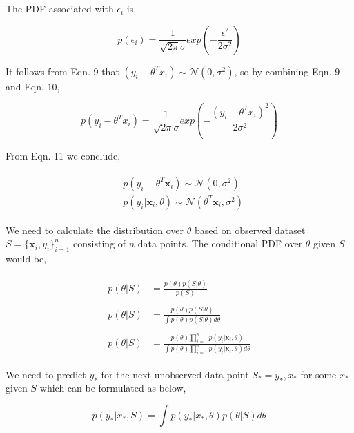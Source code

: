 \documentclass[english]{tktltiki}
\begin{document}
The PDF associated with $\epsilon_i$ is,

\begin{equation}
p(\epsilon_i) = \frac{1}{\sqrt{2 \pi} \sigma} exp(-\frac{\epsilon^2}{2 \sigma^2})
\end{equation}


It follows from Eqn. 9 that $(y_i - \theta ^T x_i) \sim \mathcal{N}(0, \sigma^2)$, so by combining Eqn. 9 and Eqn. 10,

\begin{equation}
p(y_i - \theta ^T x_i) = \frac{1}{\sqrt{2 \pi} \sigma} exp(-\frac{(y_i - \theta ^T x_i)^2}{2 \sigma^2})
\end{equation}

From Eqn. 11 we conclude,

\begin{eqnarray}
\begin{split}
&p(y_i - \theta ^T \mathbf{x}_i) \sim \mathcal{N}(0, \sigma^2) \nonumber \\
&p(y_i | \mathbf{x}_i, \theta) \sim \mathcal{N}(\theta^T \mathbf{x}_i, \sigma^2)
\end{split}
\end{eqnarray}

We need to calculate the distribution over $\theta$ based on observed dataset $S = \{\mathbf{x}_i, y_i\}_{i=1}^n$ consisting of $n$ data points. The conditional PDF over $\theta$ given $S$ would be,

\begin{eqnarray}
\begin{split}
p(\theta | S) &= \frac{p(\theta)p(S | \theta)}{p(S)} \nonumber \\
&~\\
p(\theta | S) &= \frac{p(\theta)p(S | \theta)}{\int p(\theta)p(S | \theta)d\theta} \nonumber \\
&~\\
p(\theta | S) &= \frac{p(\theta) \prod_{i=1}^n p(y_i | \mathbf{x}_i, \theta)}{\int p(\theta) \prod_{i=1}^n p(y_i | \mathbf{x}_i, \theta) d\theta}
\end{split}
\end{eqnarray}

We need to predict $y_*$ for the next unobserved data point $S_* = {y_*, x_*}$ for some $x_*$ given $S$ which can be formulated as below,

\begin{equation}
p(y_* | x_*, S) = \int p(y_* | x_*, \theta)p(\theta | S)d \theta
\end{equation}
\end{document}
